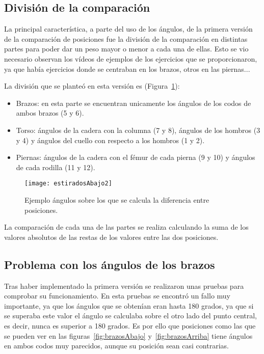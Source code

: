 \subsection{División de la comparación}
La principal característica, a parte del uso de los ángulos, de la primera versión de la comparación de posiciones fue la división de la comparación en distintas partes para poder dar un peso mayor o menor a cada una de ellas. Esto se vio necesario observan los vídeos de ejemplos de los ejercicios que se proporcionaron, ya que había ejercicios donde se centraban en los brazos, otros en las piernas...

La división que se planteó en esta versión es (Figura~\ref{fig:estiradosAbajo2}):
\begin{itemize}
	\item Brazos: en esta parte se encuentran unicamente los ángulos de los codos de ambos brazos (5 y 6).
	\item Torso: ángulos de la cadera con la columna (7 y 8), ángulos de los hombros (3 y 4) y ángulos del cuello con respecto a los hombros (1 y 2).
	\item Piernas: ángulos de la cadera con el fémur de cada pierna (9 y 10) y ángulos de cada rodilla (11 y 12).
\end{itemize}

\begin{figure}[h]
	\centering
	\texttt{[image: estiradosAbajo2]}
	\caption{Ejemplo ángulos sobre los que se calcula la diferencia entre posiciones.}
	\label{fig:estiradosAbajo2}
\end{figure}

La comparación de cada una de las partes se realiza calculando la suma de los valores absolutos de las restas de los valores entre las dos posiciones.

\subsection{Problema con los ángulos de los brazos}
Tras haber implementado la primera versión se realizaron unas pruebas para comprobar su funcionamiento. En esta pruebas se encontró un fallo muy importante, ya que los ángulos que se obtenían eran hasta 180 grados, ya que si se superaba este valor el ángulo se calculaba sobre el otro lado del punto central, es decir, nunca es superior a 180 grados. Es por ello que  posiciones como las que se pueden ver en las figuras~\ref{fig:brazosAbajo} y~\ref{fig:brazosArriba} tiene ángulos en ambos codos muy parecidos, aunque su posición sean casi contrarias.

